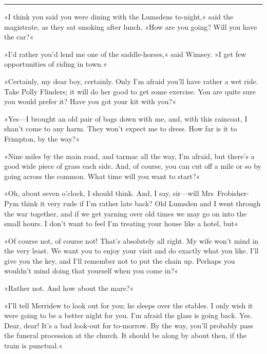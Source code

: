 \noindent\hfil\rule{0.5\textwidth}{.4pt}\hfil 

»I think you said you were dining with the Lumsdens to-night,« said the magistrate, as they sat smoking after lunch. »How are you going? Will you have the car?«

»I'd rather you'd lend me one of the saddle-horses,« said Wimsey. »I get few opportunities of riding in town.«

»Certainly, my dear boy, certainly. Only I'm afraid you'll have rather a wet ride. Take Polly Flinders; it will do her good to get some exercise. You are quite sure you would prefer it? Have you got your kit with you?«

»Yes—I brought an old pair of bags down with me, and, with this raincoat, I shan't come to any harm. They won't expect me to dress. How far is it to Frimpton, by the way?«

»Nine miles by the main road, and tarmac all the way, I'm afraid, but there's a good wide piece of grass each side. And, of course, you can cut off a mile or so by going across the common. What time will you want to start?«

»Oh, about seven o'clock, I should think. And, I say, sir—will Mrs~Frobisher-Pym think it very rude if I'm rather late back? Old Lumsden and I went through the war together, and if we get yarning over old times we may go on into the small hours. I don't want to feel I'm treating your house like a hotel, but\longdash«

»Of course not, of course not! That's absolutely all right. My wife won't mind in the very least. We want you to enjoy your visit and do exactly what you like. I'll give you the key, and I'll remember not to put the chain up. Perhaps you wouldn't mind doing that yourself when you come in?«

»Rather not. And how about the mare?«

»I'll tell Merridew to look out for you; he sleeps over the stables. I only wish it were going to be a better night for you. I'm afraid the glass is going back. Yes. Dear, dear! It's a bad look-out for to-morrow. By the way, you'll probably pass the funeral procession at the church. It should be along by about then, if the train is punctual.«

